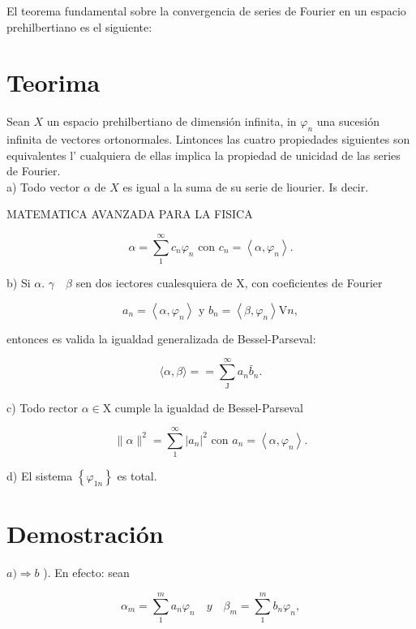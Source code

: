 \documentclass[10pt]{article}
\theoremstyle{plain}
\theoremstyle{definition}
\theoremstyle{remark}
\begin{document}
El teorema fundamental sobre la convergencia de series de Fourier en un espacio prehilbertiano es el siguiente:

\section*{Teorima}
Sean $X$ un espacio prehilbertiano de dimensión infinita, in $\varphi_{n}$ una sucesión infinita de vectores ortonormales. Lintonces las cuatro propiedades siguientes son equivalentes l' cualquiera de ellas implica la propiedad de unicidad de las series de Fourier.\\
a) Todo vector $\alpha$ de $X$ es igual a la suma de su serie de liourier. Is decir.

MATEMATICA AVANZADA PARA LA FISICA


\begin{equation*}
\alpha=\sum_{1}^{\infty} c_{n} \varphi_{n} \text { con } c_{n}=\left\langle\alpha, \varphi_{n}\right\rangle . \tag{4-6}
\end{equation*}


b) Si $\alpha$. $\gamma \quad \beta$ sen dos iectores cualesquiera de X, con coeficientes de Fourier


\begin{equation*}
a_{n}=\left\langle\alpha, \varphi_{n}\right\rangle \text { y } b_{n}=\left\langle\beta, \varphi_{n}\right\rangle \mathrm{V} n, \tag{4-7}
\end{equation*}


entonces es valida la igualdad generalizada de Bessel-Parseval:

$$
\langle\alpha, \beta\rangle==\sum_{\mathrm{J}}^{\infty} a_{n} \bar{b}_{n} .
$$

c) Todo rector $\alpha \in \mathrm{X}$ cumple la igualdad de Bessel-Parseval


\begin{equation*}
\|\alpha\|^{2}=\sum_{1}^{\infty}\left|a_{n}\right|^{2} \text { con } a_{n}=\left\langle\alpha, \varphi_{n}\right\rangle . \tag{4-8}
\end{equation*}


d) El sistema $\left\{\varphi_{1 n}\right\}$ es total.

\section*{Demostración}
$a) \Rightarrow b$ ). En efecto: sean

$$
\alpha_{m}=\sum_{1}^{m} a_{n} \varphi_{n} \quad y \quad \beta_{m}=\sum_{1}^{m} b_{n} \varphi_{n},
$$
\end{document}
